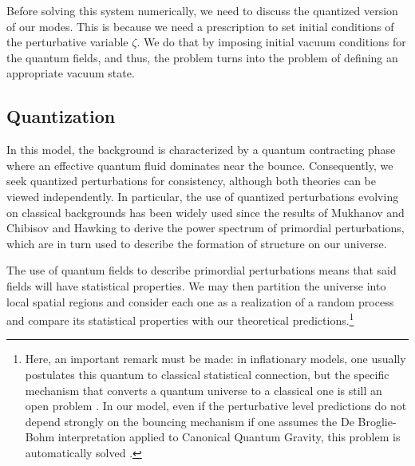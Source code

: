 \documentclass[a4paper,11pt]{article}
\begin{document}
Before solving this system numerically, we need to discuss the quantized version of our modes. This is because we need a prescription to set initial conditions of the perturbative variable $\zeta$. We do that by imposing initial vacuum conditions for the quantum fields, and thus, the problem turns into the problem of defining an appropriate vacuum state.
 
\subsection{Quantization}

In this model, the background is characterized by a quantum contracting phase where an effective quantum fluid dominates near the bounce. Consequently, we seek quantized perturbations for consistency, although both theories can be viewed independently. In particular, the use of quantized perturbations evolving on classical backgrounds has been widely used since the results of Mukhanov and Chibisov \cite{mukhanov1981quantum} and Hawking \cite{hawking1982quantum_fluctuations} to derive the power spectrum of primordial perturbations, which are in turn used to describe the formation of structure on our universe.

The use of quantum fields to describe primordial perturbations means that said fields will have statistical properties. We may then partition the universe into local spatial regions and consider each one as a realization of a random process and compare its statistical properties with our theoretical predictions.\footnote{Here, an important remark must be made: in inflationary models, one usually postulates this quantum to classical statistical connection, but the specific mechanism that converts a quantum universe to a classical one is still an open problem \cite{nelson2021bouncing,mukhanov2005physical}. In our model, even if the perturbative level predictions do not depend strongly on the bouncing mechanism if one assumes the De Broglie-Bohm interpretation applied to Canonical Quantum Gravity, this problem is automatically solved \cite{nelson_bohm2023}. }
\end{document}
